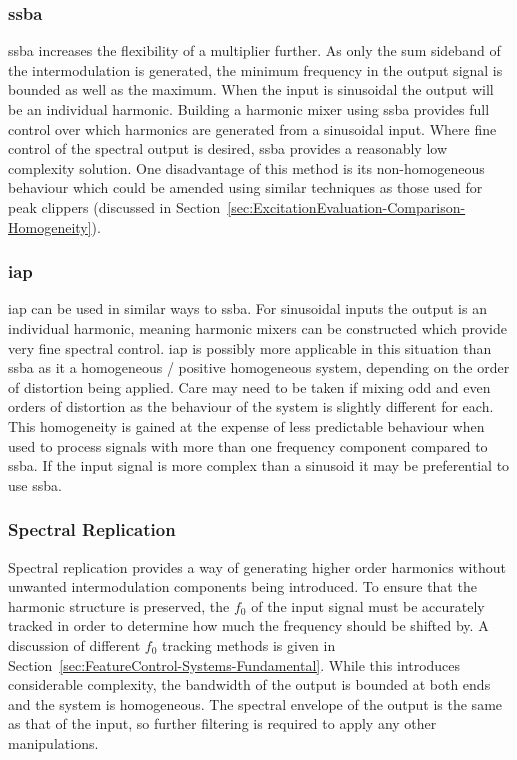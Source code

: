 		\subsubsection*{\acrshort{ssba}}
			\acrshort{ssba} increases the flexibility of a multiplier further. As only the sum sideband of the
			intermodulation is generated, the minimum frequency in the output signal is bounded as well as the
			maximum. When the input is sinusoidal the output will be an individual harmonic. Building a
			harmonic mixer using \acrshort{ssba} provides full control over which harmonics are generated from
			a sinusoidal input. Where fine control of the spectral output is desired, \acrshort{ssba} provides
			a reasonably low complexity solution. One disadvantage of this method is its non-homogeneous
			behaviour which could be amended using similar techniques as those used for peak clippers
			(discussed in Section~\ref{sec:ExcitationEvaluation-Comparison-Homogeneity}).

		\subsubsection*{\acrshort{iap}}
			\acrshort{iap} can be used in similar ways to \acrshort{ssba}. For sinusoidal inputs the output is
			an individual harmonic, meaning harmonic mixers can be constructed which provide very fine spectral
			control. \acrshort{iap} is possibly more applicable in this situation than \acrshort{ssba} as it a
			homogeneous / positive homogeneous system, depending on the order of distortion being applied. Care
			may need to be taken if mixing odd and even orders of distortion as the behaviour of the system is
			slightly different for each. This homogeneity is gained at the expense of less predictable
			behaviour when used to process signals with more than one frequency component compared to
			\acrshort{ssba}. If the input signal is more complex than a sinusoid it may be preferential to use
			\acrshort{ssba}.

		\subsubsection*{Spectral Replication}
			Spectral replication provides a way of generating higher order harmonics without unwanted
			intermodulation components being introduced. To ensure that the harmonic structure is preserved,
			the $f_{0}$ of the input signal must be accurately tracked in order to determine how much the
			frequency should be shifted by. A discussion of different $f_{0}$ tracking methods is given in
			Section~\ref{sec:FeatureControl-Systems-Fundamental}. While this introduces considerable
			complexity, the bandwidth of the output is bounded at both ends and the system is homogeneous. The
			spectral envelope of the output is the same as that of the input, so further filtering is required
			to apply any other manipulations.

